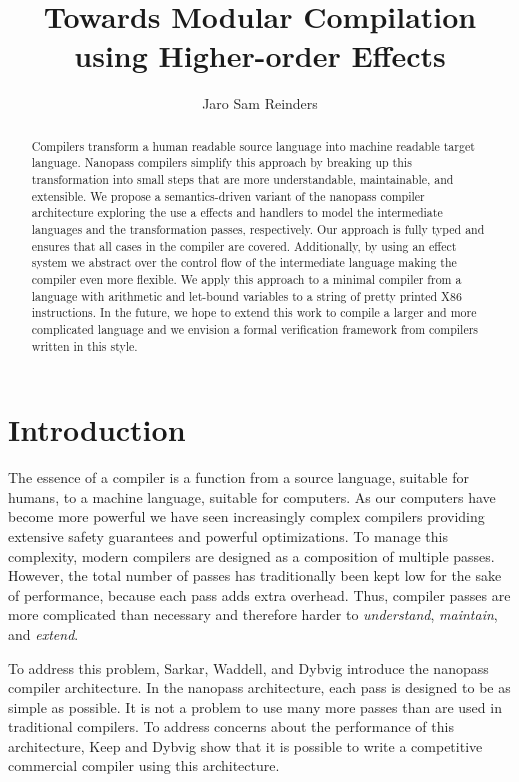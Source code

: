 \documentclass[a4paper,UKenglish,cleveref, autoref, thm-restate, anonymous]{oasics-v2021}
\title{Towards Modular Compilation using Higher-order Effects}
\author{Jaro Sam Reinders}{Delft University of Technology, Netherlands}{j.s.reinders@tudelft.nl}{https://orcid.org/0000-0002-6837-3757}{} %
\begin{document}
\maketitle

\begin{abstract}
  Compilers transform a human readable source language into machine readable target language.
  Nanopass compilers simplify this approach by breaking up this transformation into small steps that are more understandable, maintainable, and extensible.
  We propose a semantics-driven variant of the nanopass compiler architecture exploring the use a effects and handlers to model the intermediate languages and the transformation passes, respectively.
  Our approach is fully typed and ensures that all cases in the compiler are covered.
  Additionally, by using an effect system we abstract over the control flow of the intermediate language making the compiler even more flexible.
  We apply this approach to a minimal compiler from a language with arithmetic and let-bound variables to a string of pretty printed X86 instructions.
  In the future, we hope to extend this work to compile a larger and more complicated language and we envision a formal verification framework from compilers written in this style.
\end{abstract}

\section{Introduction}

The essence of a compiler is a function from a source language, suitable for humans, to a machine language, suitable for computers.
As our computers have become more powerful we have seen increasingly complex compilers providing extensive safety guarantees and powerful optimizations.
To manage this complexity, modern compilers are designed as a composition of multiple passes.
However, the total number of passes has traditionally been kept low for the sake of performance, because each pass adds extra overhead.
Thus, compiler passes are more complicated than necessary and therefore harder to \emph{understand}, \emph{maintain}, and \emph{extend}.

To address this problem, Sarkar, Waddell, and Dybvig \cite{10.1145/1016850.1016878} introduce the nanopass compiler architecture.
In the nanopass architecture, each pass is designed to be as simple as possible.
It is not a problem to use many more passes than are used in traditional compilers. 
To address concerns about the performance of this architecture, Keep and Dybvig \cite{10.1145/2544174.2500618} show that it is possible to write a competitive commercial compiler using this architecture.
\end{document}
